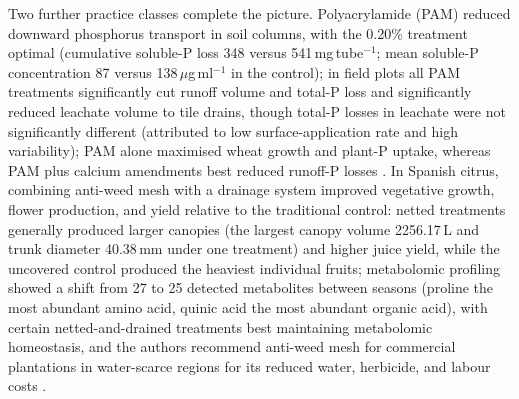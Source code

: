 Two further practice classes complete the picture. Polyacrylamide (PAM) reduced downward phosphorus transport in soil columns, with the 0.20\% treatment optimal (cumulative soluble-P loss 348 versus 541\,mg\,tube$^{-1}$; mean soluble-P concentration 87 versus 138\,$\mu$g\,ml$^{-1}$ in the control); in field plots all PAM treatments significantly cut runoff volume and total-P loss and significantly reduced leachate volume to tile drains, though total-P losses in leachate were not significantly different (attributed to low surface-application rate and high variability); PAM alone maximised wheat growth and plant-P uptake, whereas PAM plus calcium amendments best reduced runoff-P losses \parencite{Jiang2010}. In Spanish citrus, combining anti-weed mesh with a drainage system improved vegetative growth, flower production, and yield relative to the traditional control: netted treatments generally produced larger canopies (the largest canopy volume 2256.17\,L and trunk diameter 40.38\,mm under one treatment) and higher juice yield, while the uncovered control produced the heaviest individual fruits; metabolomic profiling showed a shift from 27 to 25 detected metabolites between seasons (proline the most abundant amino acid, quinic acid the most abundant organic acid), with certain netted-and-drained treatments best maintaining metabolomic homeostasis, and the authors recommend anti-weed mesh for commercial plantations in water-scarce regions for its reduced water, herbicide, and labour costs \parencite{GiménezValero2024,GiménezValero2025}.